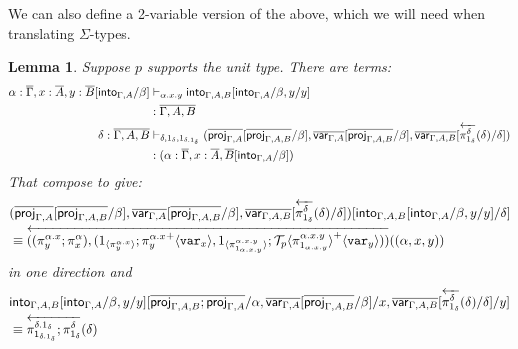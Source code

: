 \documentclass[10pt]{article}
\newtheorem{lemma}{Lemma}
\theoremstyle{definition}
\newcommand{\yields}{\vdash}
\newcommand{\rewrite}[2]{\overleftarrow{#1}(#2)}
\newcommand\ApEl[2]{\mathcal{T}_{#1}\langle#2\rangle}
\newcommand\ApPlus[2]{\ensuremath{{#1}^+ \langle #2 \rangle }}
\begin{document}
We can also define a 2-variable version of the above, which we will need when translating $\Sigma$-types. 
\begin{lemma}\label{lem:double-into}
Suppose $p$ supports the unit type.  There are terms:
\begin{align*}
\alpha : \upstairs{\Gamma}, x : \upstairs{A}, y : \upstairs{B}[\into{\Gamma, A} /\beta] &\yields_{\alpha.x.y} \into{\Gamma, A, B}[\into{\Gamma, A}/\beta, y/y] \\&: \upstairs{\Gamma,A,B} \\
\delta :\upstairs{\Gamma, A, B} &\yields_{\delta, 1_\delta, 1_{\delta.1_\delta}} (\upstairs{\proj{\Gamma, A}}[\upstairs{\proj{\Gamma, A, B}}/\beta], \upstairs{\qvar{\Gamma, A}}[\upstairs{\proj{\Gamma, A, B}}/\beta], \upstairs{\qvar{\Gamma, A, B}}[\rewrite{\pi^\delta_{1_\delta}}{\delta}/\delta]) \\&: (\alpha : \upstairs{\Gamma}, x : \upstairs{A},  \upstairs{B}[\into{\Gamma, A}/\beta])
\end{align*}
That compose to give:
\begin{align*}
&(\upstairs{\proj{\Gamma, A}}[\upstairs{\proj{\Gamma, A, B}}/\beta], \upstairs{\qvar{\Gamma, A}}[\upstairs{\proj{\Gamma, A, B}}/\beta], \upstairs{\qvar{\Gamma, A, B}}[\rewrite{\pi^\delta_{1_\delta}}{\delta}/\delta])[\into{\Gamma, A, B}[\into{\Gamma, A}/\beta, y/y]/\delta] \\
&\equiv \rewrite{((\pi^{\alpha.x}_y;\pi^\alpha_x), (\ApOne{\pi^{\alpha.x}_y};\ApPlus{\pi^{\alpha.x}_y}{\var{x}}, \ApOne{\pi^{\alpha.x.y}_{1_{\alpha.x.y}}};\ApPlus{\ApEl{p}{\pi^{\alpha.x.y}_{1_{\alpha.x.y}}}}{\var{y}}))}{(\alpha, x,y)}
\end{align*}
in one direction and
\begin{align*}
&\into{\Gamma, A, B}[\into{\Gamma, A}/\beta, y/y][\upstairs{\proj{\Gamma, A, B};\proj{\Gamma, A}}/\alpha, \upstairs{\qvar{\Gamma, A}}[\upstairs{\proj{\Gamma, A, B}}/\beta]/x, \upstairs{\qvar{\Gamma, A, B}}[\rewrite{\pi^\delta_{1_\delta}}{\delta}/\delta]/y] \\
&\equiv \rewrite{\pi^{\delta.1_\delta}_{1_{\delta.1_\delta}};\pi^{\delta}_{1_{\delta}}}{\delta}
\end{align*}
\end{lemma}
\end{document}
